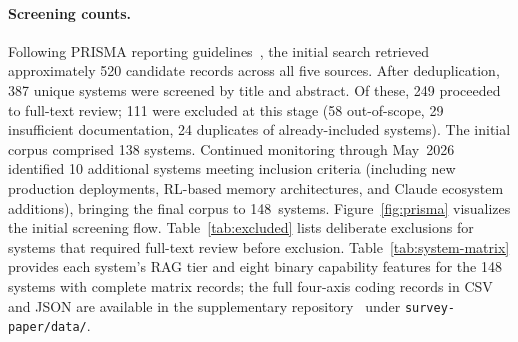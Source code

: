\paragraph{Screening counts.}
Following PRISMA reporting guidelines~\cite{page2021prisma}, the initial
search retrieved approximately 520 candidate records across all five
sources. After deduplication, 387 unique systems were screened by title
and abstract. Of these, 249 proceeded to full-text review; 111 were
excluded at this stage (58 out-of-scope, 29 insufficient documentation,
24 duplicates of already-included systems). The initial corpus comprised
138 systems. Continued monitoring through May~2026 identified 10
additional systems meeting inclusion criteria (including new production
deployments, RL-based memory architectures, and Claude ecosystem
additions), bringing the final corpus to 148~systems.
Figure~\ref{fig:prisma} visualizes the initial screening flow.
Table~\ref{tab:excluded} lists deliberate exclusions for systems that
required full-text review before exclusion. Table~\ref{tab:system-matrix}
provides each system's RAG tier and eight binary capability features for
the 148 systems with complete matrix records; the full four-axis coding
records in CSV and JSON are available in the supplementary
repository~\cite{alaya2026} under \texttt{survey-paper/data/}.

